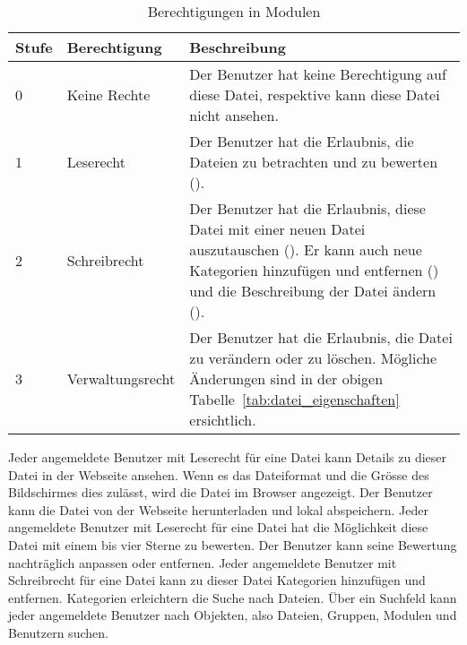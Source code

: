 \begin{table}[H]
\begin{tabularx}{\textwidth}{|l|l|X|} \hline
\textbf{Stufe} & \textbf{Berechtigung}     & \textbf{Beschreibung} \\ \hline
0     & Keine Rechte     & Der Benutzer hat keine Berechtigung auf diese Datei, respektive kann diese Datei nicht ansehen.\\ \hline
1     & Leserecht        & Der Benutzer hat die Erlaubnis, die Dateien zu betrachten und zu bewerten ({Datei bewerten}).\\ \hline
2     & Schreibrecht     & Der Benutzer hat die Erlaubnis, diese Datei mit einer neuen Datei auszutauschen ({Datei hochladen}). Er kann auch neue Kategorien hinzufügen und entfernen ({Datei kategorisieren}) und die Beschreibung der Datei ändern ({Datei bearbeiten}).\\ \hline
3     & Verwaltungsrecht & Der Benutzer hat die Erlaubnis, die Datei zu verändern oder zu löschen. Mögliche Änderungen sind in der obigen Tabelle~\ref{tab:datei_eigenschaften} ersichtlich.\\ \hline
\end{tabularx}
\caption{Berechtigungen in Modulen}
\label{tab:datei_rechte}
\end{table}

Jeder angemeldete Benutzer mit Leserecht für eine Datei kann Details zu dieser Datei in der Webseite ansehen. Wenn es das Dateiformat und die Grösse des Bildschirmes dies zulässt, wird die Datei im Browser angezeigt. Der Benutzer kann die Datei von der Webseite herunterladen und lokal abspeichern.
Jeder angemeldete Benutzer mit Leserecht für eine Datei hat die Möglichkeit diese Datei mit einem bis vier Sterne  zu bewerten. Der Benutzer kann seine Bewertung nachträglich anpassen oder entfernen.
Jeder angemeldete Benutzer mit Schreibrecht für eine Datei kann zu dieser Datei Kategorien hinzufügen und entfernen. Kategorien erleichtern die Suche nach Dateien.
Über ein Suchfeld kann jeder angemeldete Benutzer nach Objekten, also Dateien, Gruppen, Modulen und Benutzern suchen.\\

